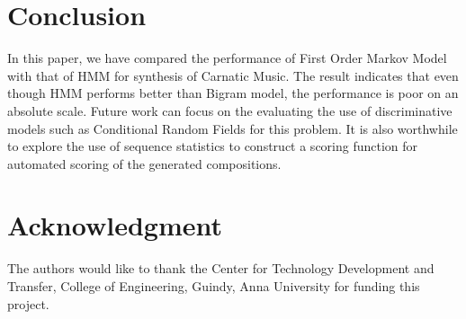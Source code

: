 \documentclass[journal]{IEEEtran}
\begin{document}
\section{Conclusion}
In this paper, we have compared the performance of First Order Markov Model with that of HMM for synthesis of Carnatic Music. The result indicates that even though HMM performs better than Bigram model, the performance is poor on an absolute scale. Future work can focus on the evaluating the use of discriminative models such as Conditional Random Fields for this problem. It is also worthwhile to explore the use of sequence statistics to construct a scoring function for automated scoring of the generated compositions.

\section*{Acknowledgment}
The authors would like to thank the Center for Technology Development and Transfer, College of Engineering, Guindy, Anna University for funding this project.

\ifCLASSOPTIONcaptionsoff
  \newpage
\fi


\end{document}
